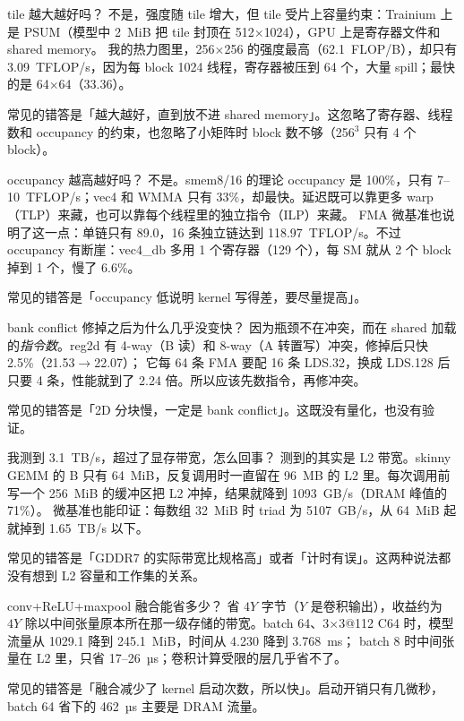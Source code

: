 \documentclass[11pt,a4paper]{ctexart}
\begin{document}
\begin{iqbox}{tile 越大越好吗？}
不是，强度随 tile 增大，但 tile 受片上容量约束：Trainium 上是 PSUM（模型中 2~MiB 把 tile 封顶在 512$\times$1024），GPU 上是寄存器文件和 shared memory。
我的热力图里，256$\times$256 的强度最高（62.1~FLOP/B），却只有 3.09~TFLOP/s，因为每 block 1024 线程，寄存器被压到 64 个，大量 spill；最快的是 64$\times$64（33.36）。

常见的错答是「越大越好，直到放不进 shared memory」。这忽略了寄存器、线程数和 occupancy 的约束，也忽略了小矩阵时 block 数不够（256$^3$ 只有 4 个 block）。
\end{iqbox}

\begin{iqbox}{occupancy 越高越好吗？}
不是。smem8/16 的理论 occupancy 是 100\%，只有 7--10~TFLOP/s；vec4 和 WMMA 只有 33\%，却最快。延迟既可以靠更多 warp（TLP）来藏，也可以靠每个线程里的独立指令（ILP）来藏。
FMA 微基准也说明了这一点：单链只有 89.0，16 条独立链达到 118.97~TFLOP/s。不过 occupancy 有断崖：vec4\_db 多用 1 个寄存器（129 个），每 SM 就从 2 个 block 掉到 1 个，慢了 6.6\%。

常见的错答是「occupancy 低说明 kernel 写得差，要尽量提高」。
\end{iqbox}

\begin{iqbox}{bank conflict 修掉之后为什么几乎没变快？}
因为瓶颈不在冲突，而在 shared 加载的\emph{指令数}。reg2d 有 4-way（B 读）和 8-way（A 转置写）冲突，修掉后只快 2.5\%（21.53$\to$22.07）；
它每 64 条 FMA 要配 16 条 LDS.32，换成 LDS.128 后只要 4 条，性能就到了 2.24 倍。所以应该先数指令，再修冲突。

常见的错答是「2D 分块慢，一定是 bank conflict」。这既没有量化，也没有验证。
\end{iqbox}

\begin{iqbox}{我测到 3.1~TB/s，超过了显存带宽，怎么回事？}
测到的其实是 L2 带宽。skinny GEMM 的 B 只有 64~MiB，反复调用时一直留在 96~MB 的 L2 里。每次调用前写一个 256~MiB 的缓冲区把 L2 冲掉，结果就降到 1093~GB/s（DRAM 峰值的 71\%）。
微基准也能印证：每数组 32~MiB 时 triad 为 5107~GB/s，从 64~MiB 起就掉到 1.65~TB/s 以下。

常见的错答是「GDDR7 的实际带宽比规格高」或者「计时有误」。这两种说法都没有想到 L2 容量和工作集的关系。
\end{iqbox}

\begin{iqbox}{conv+ReLU+maxpool 融合能省多少？}
省 $4Y$ 字节（$Y$ 是卷积输出），收益约为 $4Y$ 除以中间张量原本所在那一级存储的带宽。batch 64、3$\times$3@112 C64 时，模型流量从 1029.1 降到 245.1~MiB，时间从 4.230 降到 3.768~ms；
batch 8 时中间张量在 L2 里，只省 17--26~µs；卷积计算受限的层几乎省不了。

常见的错答是「融合减少了 kernel 启动次数，所以快」。启动开销只有几微秒，batch 64 省下的 462~µs 主要是 DRAM 流量。
\end{iqbox}
\end{document}
